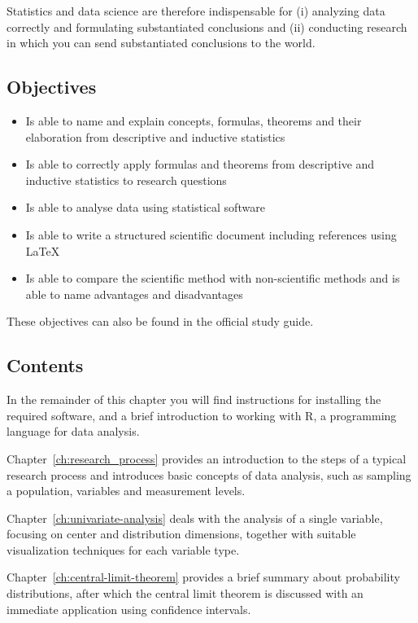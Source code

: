 Statistics and data science are therefore indispensable for (i) analyzing data correctly and formulating substantiated conclusions and (ii) conducting research in which you can send substantiated conclusions to the world.

\subsection{Objectives}

\begin{itemize}
    \item Is able to name and explain concepts, formulas, theorems  and their elaboration from descriptive and inductive statistics
    \item Is able to correctly apply formulas and theorems from descriptive and inductive statistics to research questions
    \item Is able to analyse data using statistical software
    \item Is able to write a structured scientific document including references using \LaTeX{}
    \item Is able to compare the scientific method with non-scientific methods and is able to name advantages and disadvantages
\end{itemize}

These objectives can also be found in the official study guide.

\subsection{Contents}

In the remainder of this chapter you will find instructions for installing the required software, and a brief introduction to working with R, a programming language for data analysis.

Chapter~\ref{ch:research_process} provides an introduction to the steps of a typical research process and introduces basic concepts of data analysis, such as sampling a population, variables and measurement levels.

Chapter~\ref{ch:univariate-analysis} deals with the analysis of a single variable, focusing on center and distribution dimensions, together with suitable visualization techniques for each variable type.

Chapter~\ref {ch:central-limit-theorem} provides a brief summary about probability distributions, after which the central limit theorem is discussed with an immediate application using confidence intervals.

